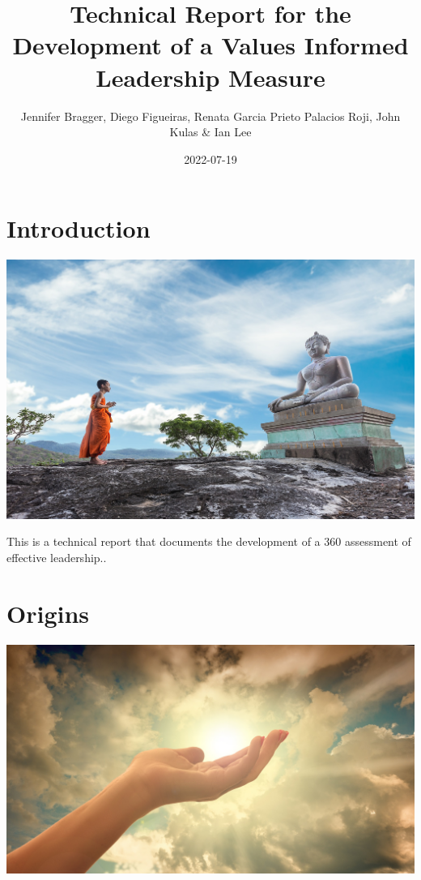 \documentclass[
]{book}
\title{Technical Report for the Development of a Values Informed Leadership Measure}
\author{Jennifer Bragger, Diego Figueiras, Renata Garcia Prieto Palacios Roji, John Kulas \& Ian Lee}
\date{2022-07-19}
\begin{document}
\maketitle

{
\setcounter{tocdepth}{1}
\tableofcontents
}
\hypertarget{introduction}{%
\chapter{Introduction}\label{introduction}}

\includegraphics{monk-g0dbed9dae_1920.jpg}

This is a technical report that documents the development of a 360 assessment of effective leadership..

\hypertarget{origins}{%
\chapter{Origins}\label{origins}}

\includegraphics{religion-g96a8473e7_1920.jpg}
\end{document}
